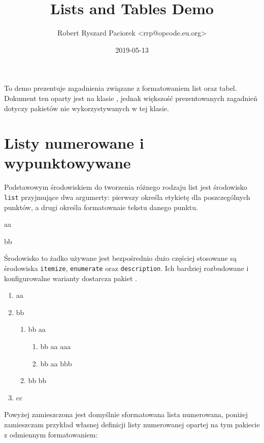 \documentclass[fontSize=10pt, extra]{pdfArticle}
\title {Lists and Tables Demo}
\author{Robert Ryszard Paciorek <rrp@opcode.eu.org>}
\date  {2019-05-13}
\begin{document}
To demo prezentuje zagadnienia związane z formatowaniem list oraz tabel.
Dokument ten oparty jest na klasie ,
	jednak większość prezentowanych zagadnień dotyczy pakietów nie wykorzystywanych w tej klasie.

\vspace{-0.3cm}

\section{Listy numerowane i wypunktowywane}

Podstawowym środowiskiem do tworzenia różnego rodzaju list jest środowisko \Verb$list$ przyjmujące dwa argumerty:
	pierwszy określa etykietę dla poszczególnych punktów, a drugi określa formatownaie tekstu danego punktu.

\begin{Example}
\begin{list}{\color{red}→}{\color{blue}}
\item aa
\item bb
\end{list}
\end{Example}

Środowisko to żadko używane jest bezpośrednio dużo częściej stosowane są środowiska \Verb$itemize$, \Verb$enumerate$ oraz \Verb$description$.
Ich bardziej rozbudowane i konfigurowalne warianty dostarcza pakiet .

\begin{Example}
\begin{enumerate}
	\item aa
	\item bb
	\begin{enumerate}
		\item bb aa
		\begin{enumerate}
			\item bb aa aaa
			\item bb aa bbb
		\end{enumerate}
		\item bb bb
	\end{enumerate}
	\item cc
\end{enumerate}
\end{Example}

Powyżej zamieszczona jest domyślnie sformatowana lista numerowana, poniżej zamieszczam przykład własnej definicji listy numerowanej opartej na tym pakiecie z odmiennym formatowaniem:
\end{document}
